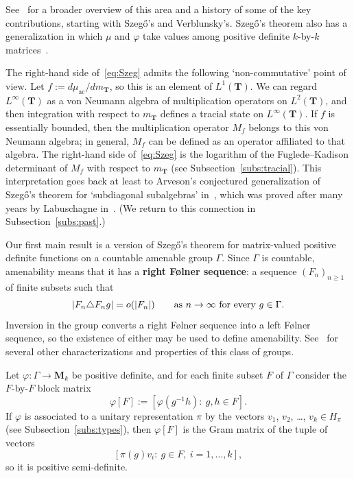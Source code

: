 \documentclass[12pt,a4paper]{article}
\numberwithin{equation}{section}
\theoremstyle{remark}
\renewcommand{\rm}[1]{\mathrm{#1}}
\newcommand{\bbT}{\mathbf{T}}
\newcommand{\rmM}{\mathbf{M}}
\newcommand{\G}{\Gamma}
\renewcommand{\phi}{\varphi}
\newcommand{\g}{\gamma}
\begin{document}
See~\cite[Chap. 1]{SimOPUCI} for a broader overview of this area and a history of some of the key contributions, starting with Szeg\H{o}'s and Verblunsky's. Szeg\H{o}'s theorem also has a generalization in which $\mu$ and $\phi$ take values among positive definite $k$-by-$k$ matrices~\cite[Sec. 2.13]{SimOPUCI}.

The right-hand side of~\eqref{eq:Szeg} admits the following `non-commutative' point of view.  Let $f := d\mu_{\rm{ac}}/d m_\bbT$, so this is an element of $L^1(\bbT)$.  We can regard $L^\infty(\bbT)$ as a von Neumann algebra of multiplication operators on $L^2(\bbT)$, and then integration with respect to $m_\bbT$ defines a tracial state on $L^\infty(\bbT)$.  If $f$ is essentially bounded, then the multiplication operator $M_f$ belongs to this von Neumann algebra; in general, $M_f$ can be defined as an operator affiliated to that algebra. The right-hand side of~\eqref{eq:Szeg} is the logarithm of the Fuglede--Kadison determinant of $M_f$ with respect to $m_\bbT$ (see Subsection~\ref{subs:tracial}).  This interpretation goes back at least to Arveson's conjectured generalization of Szeg\H{o}'s theorem for `subdiagonal subalgebras' in~\cite[property 4.4($\g)$]{Arv67}, which was proved after many years by Labuschagne in~\cite{Lab05}.  (We return to this connection in Subsection~\ref{subs:past}.)

Our first main result is a version of Szeg\H{o}'s theorem for matrix-valued positive definite functions on a countable amenable group $\G$.  Since $\G$ is countable, amenability means that it has a \textbf{right F\o lner sequence}: a sequence $(F_n)_{n\ge 1}$ of finite subsets such that
\begin{equation}\label{eq:right-Folner}
|F_n\triangle F_n g| = o(|F_n|) \qquad \hbox{as $n\to\infty$ for every $g \in \G$}.
\end{equation}
Inversion in the group converts a right F\o lner sequence into a left F\o lner sequence, so the existence of either may be used to define amenability.  See~\cite[Sec. 2.6]{BroOza08} for several other characterizations and properties of this class of groups.

Let $\phi:\G\to \rmM_k$ be positive definite, and for each finite subset $F$ of $\G$ consider the $F$-by-$F$ block matrix
\[\phi[F] := [\phi(g^{-1}h):\ g,h \in F].\]
If $\phi$ is associated to a unitary representation $\pi$ by the vectors $v_1$, $v_2$, \dots, $v_k \in H_\pi$ (see Subsection~\ref{subs:types}), then $\phi[F]$ is the Gram matrix of the tuple of vectors
\[[\pi(g)v_i:\ g \in F,\ i=1,\dots,k],\]
so it is positive semi-definite.
\end{document}
